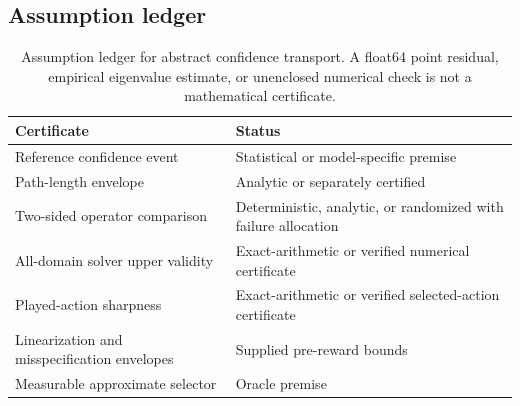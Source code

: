 \subsection{Assumption ledger}

\begin{table}[H]
\caption{Assumption ledger for abstract confidence transport.  A float64 point
residual, empirical eigenvalue estimate, or unenclosed numerical check is not a
mathematical certificate.}
\label{tab:transport-assumption-ledger}
\centering\ccetablesize
\begin{tabularx}{\columnwidth}{@{}p{}X@{}}
\toprule
Certificate & Status \\
\midrule
Reference confidence event & Statistical or model-specific premise \\
Path-length envelope & Analytic or separately certified \\
Two-sided operator comparison & Deterministic, analytic, or randomized with failure allocation \\
All-domain solver upper validity & Exact-arithmetic or verified numerical certificate \\
Played-action sharpness & Exact-arithmetic or verified selected-action certificate \\
Linearization and misspecification envelopes & Supplied pre-reward bounds \\
Measurable approximate selector & Oracle premise \\
\bottomrule
\end{tabularx}

\end{table}

